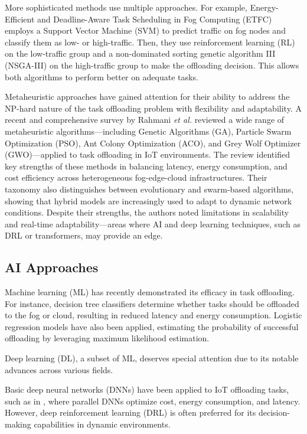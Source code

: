 \documentclass[preprint,12pt]{elsarticle}
\begin{document}
More sophisticated methods use multiple approaches. For example, Energy-Efficient and Deadline-Aware Task Scheduling in Fog Computing (ETFC) \cite{pakmehr_etfc_2024} employs a Support Vector Machine (SVM) to predict traffic on fog nodes and classify them as low- or high-traffic. Then, they use reinforcement learning (RL) on the low-traffic group and a non-dominated sorting genetic algorithm III (NSGA-III) on the high-traffic group to make the offloading decision. This allows both algorithms to perform better on adequate tasks.

Metaheuristic approaches have gained attention for their ability to address the NP-hard nature of the task offloading problem with flexibility and adaptability. A recent and comprehensive survey by Rahmani \textit{et al.} \cite{rahmani_optimizing_2025} reviewed a wide range of metaheuristic algorithms—including Genetic Algorithms (GA), Particle Swarm Optimization (PSO), Ant Colony Optimization (ACO), and Grey Wolf Optimizer (GWO)—applied to task offloading in IoT environments. The review identified key strengths of these methods in balancing latency, energy consumption, and cost efficiency across heterogeneous fog-edge-cloud infrastructures. Their taxonomy also distinguishes between evolutionary and swarm-based algorithms, showing that hybrid models are increasingly used to adapt to dynamic network conditions. Despite their strengths, the authors noted limitations in scalability and real-time adaptability—areas where AI and deep learning techniques, such as DRL or transformers, may provide an edge.

\subsection{AI Approaches}
Machine learning (ML) has recently demonstrated its efficacy in task offloading. For instance, decision tree classifiers \cite{suryadevara_energy_2021} determine whether tasks should be offloaded to the fog or cloud, resulting in reduced latency and energy consumption. Logistic regression models \cite{bukhari_intelligent_2022} have also been applied, estimating the probability of successful offloading by leveraging maximum likelihood estimation.

Deep learning (DL), a subset of ML, deserves special attention due to its notable advances across various fields. 

Basic deep neural networks (DNNs) have been applied to IoT offloading tasks, such as in \cite{sarkar_deep_2022}, where parallel DNNs optimize cost, energy consumption, and latency. However, deep reinforcement learning (DRL) is often preferred for its decision-making capabilities in dynamic environments.
\end{document}
